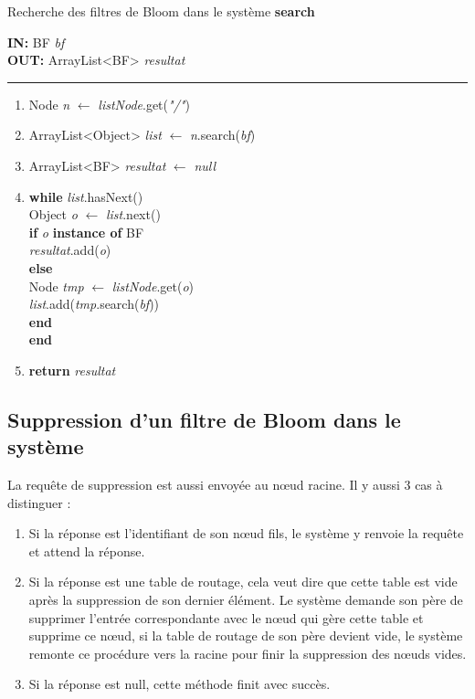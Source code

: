 \documentclass[a4paper,11pt]{report}
\begin{document}
\begin{algorithme}
	Recherche des filtres de Bloom dans le système \textbf{search}
\end{algorithme}

\begin{flushleft}
	\begin{framed}
		\textbf{IN:} BF \textit{bf} \\
		\textbf{OUT:} ArrayList<BF> \textit{resultat}\\
		\noindent\rule{\linewidth}{0.5pt}

		\begin{enumerate}
			\item Node \textit{n} $\leftarrow$ \textit{listNode}.get(\textit{"/"})
			\item ArrayList<Object> \textit{list} $\leftarrow$ \textit{n}.search(\textit{bf})
			\item ArrayList<BF> \textit{resultat} $\leftarrow$ \textit{null}
			\item
				\begin{tabbing}
					\textbf{wh}\=\textbf{ile }\=\textit{list}.hasNext()\\
						\> Object \textit{o} $\leftarrow$ \textit{list}.next()\\
						\> \textbf{if }\= \textit{o} \textbf{instance of} BF\\
						\> \> \textit{resultat}.add(\textit{o})\\
						\> \textbf{else}\\
						\> \> Node \textit{tmp} $\leftarrow$ \textit{listNode}.get(\textit{o})\\
						\> \> \textit{list}.add(\textit{tmp}.search(\textit{bf}))\\
						\> \textbf{end}\\
					\textbf{end}
				\end{tabbing}
			\item \textbf{return} \textit{resultat}									
		\end{enumerate}	
	\end{framed}
\end{flushleft}


\subsection{Suppression d'un filtre de Bloom dans le système}
	La requête de suppression est aussi envoyée au nœud racine. Il y aussi 3 cas à distinguer :
	\begin{enumerate}
		\item Si la réponse est l'identifiant de son nœud fils, le système y renvoie la requête et attend la réponse.
		\item Si la réponse est une table de routage, cela veut dire que cette table est vide après la suppression de son dernier élément. Le système demande son père de supprimer l'entrée correspondante avec le nœud qui gère cette table et supprime ce nœud, si la table de routage de son père devient vide, le système remonte ce procédure vers la racine pour finir la suppression des nœuds vides.
		\item Si la réponse est null, cette méthode finit avec succès.
	\end{enumerate}
\end{document}
